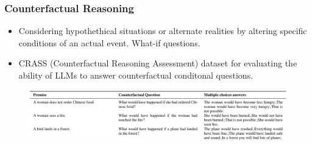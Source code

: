 \documentclass{beamer}
\begin{document}

\begin{frame}
	\frametitle{Counterfactual Reasoning}
	\begin{itemize}
		\item Considering hypothethical situations or alternate
			realities by altering specific conditions of an actual
			event. What-if questions.
		\item CRASS (Counterfactual Reasoning Assessment) dataset for
			evaluating the ability of LLMs to answer counterfactual
			conditonal questions.
	\end{itemize}
	\begin{figure}
		\centering
		\includegraphics[scale=0.22]{imgs/table8.png}
	\end{figure}
\end{frame}
\end{document}
